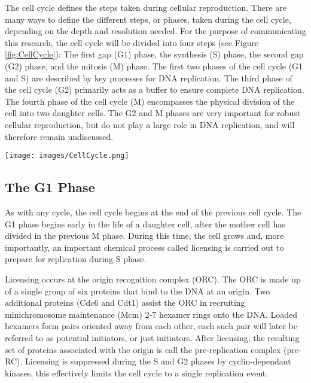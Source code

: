 	The cell cycle defines the steps taken during cellular reproduction.
	There are many ways to define the different steps, or phases, taken during the cell cycle, depending on the depth and resolution needed.
	For the purpose of communicating this research, the cell cycle will be divided into four steps (see Figure \ref{fig:CellCycle}):
	The first gap (G1) phase, the synthesis (S) phase, the second gap (G2) phase, and the mitosis (M) phase.
	The first two phases of the cell cycle (G1 and S) are described by key processes for DNA replication.
	The third phase of the cell cycle (G2) primarily acts as a buffer to ensure complete DNA replication.
	The fourth phase of the cell cycle (M) encompasses the physical division of the cell into two daughter cells.
	The G2 and M phases are very important for robust cellular reproduction, but do not play a large role in DNA replication, and will therefore remain undiscussed.
	
	\begin{SCfigure}[1][thb]
		\texttt{[image: images/CellCycle.png]}
		\caption[Cell Cycle]{\label{fig:CellCycle} The complete cell cycle is made up of four phases: 
			The Mitosis (M) phase, when a mother cell separates into two daughter cells. 
			The first Gap (G1) phase, when the daughter cell undergoes growth and chemical preparation for DNA replication.
			The Synthesis (S) phase, when the DNA is replicated.
			And the second Gap (G2) phase which acts as a buffer to ensure complete replication before the M phase.}
	\end{SCfigure}
	
		\subsection{The G1 Phase}
		\label{subsec:G1Phase}
		
		As with any cycle, the cell cycle begins at the end of the previous cell cycle.
		The G1 phase begins early in the life of a daughter cell, after the mother cell has divided in the previous M phase.
		During this time, the cell grows and, more importantly, an important chemical process called licensing is carried out to prepare for replication during S phase.
		
		Licensing occurs at the origin recognition complex (ORC).
		The ORC is made up of a single group of six proteins that bind to the DNA at an origin.
		Two additional proteins (Cdc6 and Cdt1) assist the ORC in recruiting minichromosome maintenance (Mcm) 2-7 hexamer rings onto the DNA.
		Loaded hexamers form pairs oriented away from each other, each such pair will later be referred to as potential initiators, or just initiators.
		After licensing, the resulting set of proteins associated with the origin is call the pre-replication complex (pre-RC).
		Licensing is suppressed during the S and G2 phases by cyclin-dependant kinases, this effectively limits the cell cycle to a single replication event. \cite{MolecularCellBiology}
		
